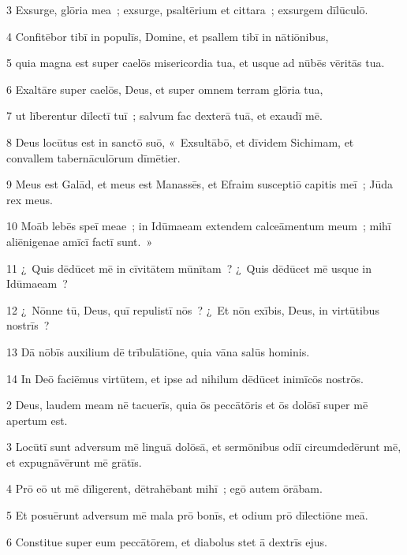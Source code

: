 \psalmVerse
  {\phantom{00}3}
  {Exsurge, glōria mea~; exsurge, psaltērium et cittara~; exsurgem dīlūculō.}


\psalmVerse
  {\phantom{00}4}
  {Confitēbor tibī in populīs, Domine, et psallem tibī in nātiōnibus,}


\psalmVerse
  {\phantom{00}5}
  {quia magna est super caelōs misericordia tua, et usque ad nūbēs vēritās tua.}


\psalmVerse
  {\phantom{00}6}
  {Exaltāre super caelōs, Deus, et super omnem terram glōria tua,}


\psalmVerse
  {\phantom{00}7}
  {ut līberentur dīlectī tuī~; salvum fac dexterā tuā, et exaudī mē.}


\psalmVerse
  {\phantom{00}8}
  {Deus locūtus est in sanctō suō, «~Exsultābō, et dīvidem Sichimam, et convallem tabernāculōrum dīmētier.}


\psalmVerse
  {\phantom{00}9}
  {Meus est Galād, et meus est Manassēs, et Efraim susceptiō capitis meī~; Jūda rex meus.}


\psalmVerse
  {\phantom{0}10}
  {Moāb lebēs speī meae~; in Idūmaeam extendem calceāmentum meum~; mihī aliēnigenae amīcī factī sunt.~»}


\psalmVerse
  {\phantom{0}11}
  {¿~Quis dēdūcet mē in cīvitātem mūnītam~? ¿~Quis dēdūcet mē usque in Idūmaeam~?}


\psalmVerse
  {\phantom{0}12}
  {¿~Nōnne tū, Deus, quī repulistī nōs~? ¿~Et nōn exībis, Deus, in virtūtibus nostrīs~?}


\psalmVerse
  {\phantom{0}13}
  {Dā nōbīs auxilium dē trībulātiōne, quia vāna salūs hominis.}


\psalmVerse
  {\phantom{0}14}
  {In Deō faciēmus virtūtem, et ipse ad nihilum dēdūcet inimīcōs nostrōs.}



\psalmVerse
  {\phantom{00}2}
  {Deus, laudem meam nē tacuerīs, quia ōs peccātōris et ōs dolōsī super mē apertum est.}


\psalmVerse
  {\phantom{00}3}
  {Locūtī sunt adversum mē linguā dolōsā, et sermōnibus odiī circumdedērunt mē, et expugnāvērunt mē grātīs.}


\psalmVerse
  {\phantom{00}4}
  {Prō eō ut mē dīligerent, dētrahēbant mihī~; egō autem ōrābam.}


\psalmVerse
  {\phantom{00}5}
  {Et posuērunt adversum mē mala prō bonīs, et odium prō dīlectiōne meā.}


\psalmVerse
  {\phantom{00}6}
  {Constitue super eum peccātōrem, et diabolus stet ā dextrīs ejus.}



